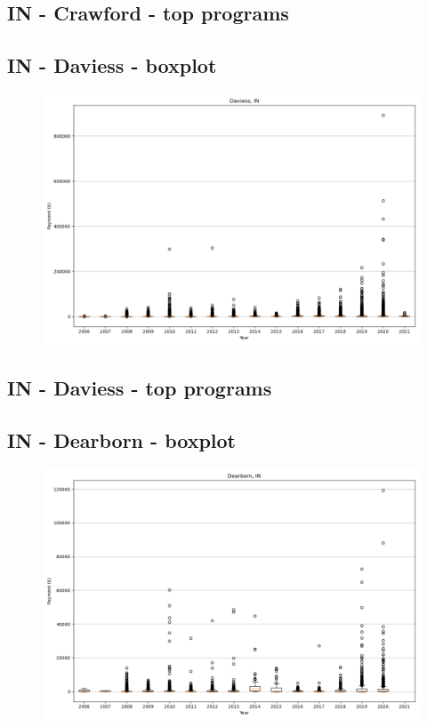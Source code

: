 \subsection*{IN - Crawford - top programs}

\newpage
\subsection*{IN - Daviess - boxplot}
\begin{figure}[h]
\centering
\includegraphics[width=7in]{../output/boxplots/counties/Daviess-IN_boxplot.png}
\end{figure}


\subsection*{IN - Daviess - top programs}

\newpage
\subsection*{IN - Dearborn - boxplot}
\begin{figure}[h]
\centering
\includegraphics[width=7in]{../output/boxplots/counties/Dearborn-IN_boxplot.png}
\end{figure}



